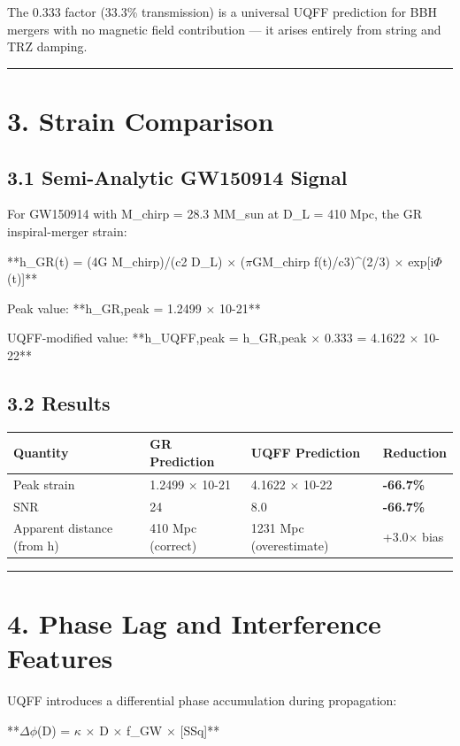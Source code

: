\documentclass[11pt]{article}
\begin{document}
The 0.333 factor (33.3\% transmission) is a universal UQFF prediction for BBH mergers with no magnetic field contribution --- it arises entirely from string and TRZ damping.

\noindent\rule{\textwidth}{0.4pt}

\section*{3. Strain Comparison}

\subsection*{3.1 Semi-Analytic GW150914 Signal}

For GW150914 with M\_chirp = 28.3 MM\_sun at D\_L = 410 Mpc, the GR inspiral-merger strain:

**h\_GR(t) = (4G M\_chirp)/(c2 D\_L) $\times$ ($\pi$GM\_chirp f(t)/c3)\textasciicircum{}(2/3) $\times$ exp[i$\Phi$(t)]**

Peak value: **h\_GR,peak = 1.2499 $\times$ 10-21**

UQFF-modified value: **h\_UQFF,peak = h\_GR,peak $\times$ 0.333 = 4.1622 $\times$ 10-22**

\subsection*{3.2 Results}

\begin{center}
\begin{longtable}{llll}
\toprule
Quantity & GR Prediction & UQFF Prediction & Reduction \tabularnewline
\midrule
\endhead
Peak strain & 1.2499 $\times$ 10-21 & 4.1622 $\times$ 10-22 & \textbf{-66.7\%} \tabularnewline
SNR & 24 & 8.0 & \textbf{-66.7\%} \tabularnewline
Apparent distance (from h) & 410 Mpc (correct) & 1231 Mpc (overestimate) & +3.0$\times$ bias \tabularnewline
\bottomrule
\end{longtable}
\end{center}

\noindent\rule{\textwidth}{0.4pt}

\section*{4. Phase Lag and Interference Features}

UQFF introduces a differential phase accumulation during propagation:

**$\Delta$$\phi$(D) = $\kappa$ $\times$ D $\times$ f\_GW $\times$ [SSq]**
\end{document}
